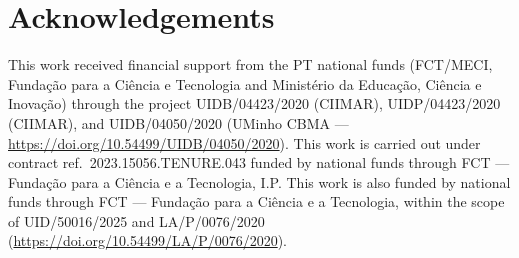 \chapter*{Acknowledgements}
\setlength{\parskip}{1em}

This work received financial support from the PT national funds (FCT/MECI, Fundação para a
Ciência e Tecnologia and Ministério da Educação, Ciência e Inovação) through the project
UIDB/04423/2020 (CIIMAR), UIDP/04423/2020 (CIIMAR), and UIDB/04050/2020 (UMinho CBMA ---
\url{https://doi.org/10.54499/UIDB/04050/2020}). This work is carried out under contract
ref.\ 2023.15056.TENURE.043 funded by national funds through FCT --- Fundação para a Ciência
e a Tecnologia, I.P. This work is also funded by national funds through FCT --- Fundação para
a Ciência e a Tecnologia, within the scope of UID/50016/2025 and LA/P/0076/2020
(\url{https://doi.org/10.54499/LA/P/0076/2020}).

\setlength{\parskip}{0em}